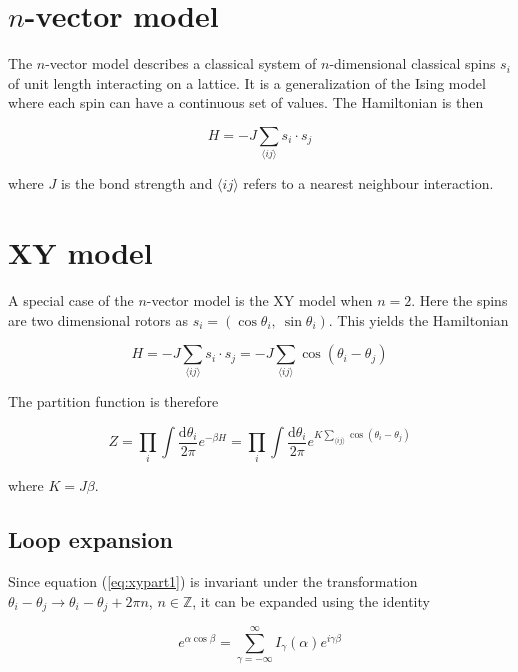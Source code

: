 
\section{$n$-vector model}
\label{sec:nVector}

The $n$-vector model describes a classical system of $n$-dimensional classical spins $s_i$ of unit length interacting on a lattice. It is a generalization of the Ising model where each spin can have a continuous set of values. The Hamiltonian is then

\begin{equation}
    H = -J\sum_{\langle ij \rangle} s_i \cdot s_j
\end{equation}

where $J$ is the bond strength and $\langle ij \rangle$ refers to a nearest neighbour interaction.

\section{XY model}
\label{sec:XYModel}

A special case of the $n$-vector model is the XY model when $n = 2$. Here the spins are two dimensional rotors as $s_i = (\cos \theta_i, \  \sin \theta_i)$. This yields the Hamiltonian

\begin{equation}
    H = - J \sum_{\langle ij \rangle} s_i \cdot s_j =  - J \sum_{\langle ij \rangle} \cos(\theta_i - \theta_j)
\end{equation}

The partition function is therefore

\begin{equation}
    Z = \prod_i \int \frac{\mathrm d \theta_i}{2 \pi} e^{-\beta H} = \prod_i \int \frac{\mathrm d \theta_i}{2 \pi} e^{K \sum_{\langle ij \rangle} \cos(\theta_i - \theta_j)}
\label{eq:xypart1}
\end{equation}

where $K = J \beta$.

\subsection{Loop expansion}
\label{subsec:XYLoopexp}

Since equation (\ref{eq:xypart1}) is invariant under the transformation $\theta_i - \theta_j \rightarrow \theta_i - \theta_j + 2 \pi n$, $n \in \mathbb{Z}$, it can be expanded using the identity

\begin{equation}
    e^{\alpha \cos \beta} = \sum_{\gamma = -\infty}^{\infty} I_\gamma ( \alpha ) e^{i \gamma \beta}
\end{equation}

